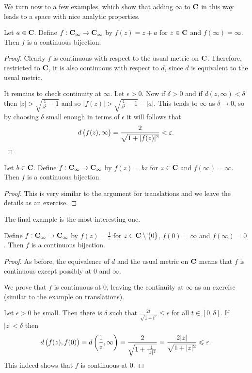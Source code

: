We turn now to a few examples, which show that adding $\infty$ to $\mathbf C$ in this way leads to a space with nice analytic properties.

\begin{example}[Translations]
Let $a\in\mathbf C$. Define $f:\mathbf C_\infty\to\mathbf C_\infty$ by $f(z)=z+a$ for $z\in\mathbf C$ and $f(\infty)=\infty$. Then $f$ is a continuous bijection.
\end{example}

\begin{proof}
Clearly $f$ is continuous with respect to the usual metric on $\mathbf C$. Therefore, restricted to $\mathbf C$, it is also continuous with respect to $d$, since $d$ is equivalent to the usual metric.

It remains to check continuity at $\infty$. Let $\epsilon>0$. Now if $\delta>0$ and if $d(z,\infty)<\delta$ then $|z|>\sqrt{\frac{4}{\delta^2}-1}$ and so $|f(z)|>\sqrt{\frac{4}{\delta^2}-1}-|a|$. This tends to $\infty$ as $\delta\to0$, so by choosing $\delta$ small enough in terms of $\epsilon$ it will follows that
\[d\left(f(z),\infty\right)=\frac{2}{\sqrt{1+|f(z)|^2}}<\varepsilon.\]
\end{proof}

\begin{example}[Dilations]
Let $b\in\mathbf C$. Define $f:\mathbf C_\infty\to\mathbf C_\infty$ by $f(z)=bz$ for $z\in\mathbf C$ and $f(\infty)=\infty$. Then $f$ is a continuous bijection.
\end{example}

\begin{proof}
This is very similar to the argument for translations and we leave the details as an exercise.
\end{proof}

The final example is the most interesting one.

\begin{example}[Inversion]
Define $f:\mathbf C_\infty\to\mathbf C_\infty$ by $f(z)=\frac{1}{z}$ for $z\in\mathbf C\setminus\{0\}$, $f(0)=\infty$ and $f(\infty)=0$. Then $f$ is a continuous bijection.
\end{example}

\begin{proof}
As before, the equivalence of $d$ and the usual metric on $\mathbf C$ means that $f$ is continuous except possibly at $0$ and $\infty$.

We prove that $f$ is continuous at $0$, leaving the continuity at $\infty$ as an exercise (similar to the example on translations).

Let $\epsilon>0$ be small. Then there is $\delta$ such that $\frac{2t}{\sqrt{1+t^2}}\le\epsilon$ for all $t\in[0,\delta]$. If $|z|<\delta$ then
\[d\left(f(z),f(0)\right)=d\left(\frac{1}{z},\infty\right)=\frac{2}{\sqrt{1+\frac{1}{|z|^2}}}=\frac{2|z|}{\sqrt{1+|z|^2}}\leqslant\varepsilon.\]
This indeed shows that $f$ is continuous at $0$.
\end{proof}

